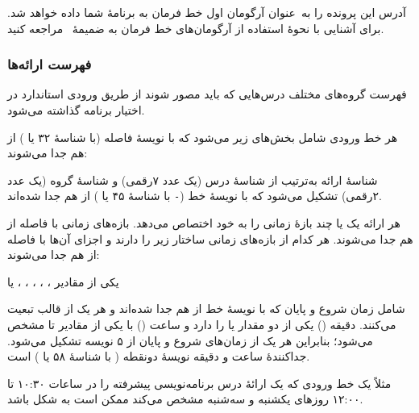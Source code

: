 \documentclass{utap}
\renewcommand{\labelitemi}{$\circ$}
\renewcommand{\labelitemii}{$\diamond$}
\begin{document}
    آدرس این پرونده را به~عنوان آرگومان اول خط فرمان به برنامهٔ شما داده خواهد شد. برای آشنایی با نحوهٔ استفاده از آرگومان‌های خط فرمان به ضمیمهٔ~ مراجعه کنید.

    \subsubsection{فهرست ارائه‌ها}

    فهرست گروه‌های مختلف درس‌هایی که باید مصور شوند از طریق ورودی استاندارد  در اختیار برنامه گذاشته می‌شود.

    هر خط ورودی شامل بخش‌های زیر می‌شود که با نویسهٔ فاصله (با شناسهٔ  ۳۲ یا ) از هم جدا می‌شوند:
    \begin{description}[leftmargin=9em,style=nextline,font=\labelitemi\quad\bfseries]
        \item[شناسهٔ ارائه] شناسهٔ ارائه به‌ترتیب از شناسهٔ درس (یک عدد ۷‌رقمی) و شناسهٔ گروه (یک عدد ۲‌رقمی) تشکیل می‌شود که با نویسهٔ خط (\verb|-| با شناسهٔ  ۴۵ یا ) از هم جدا شده‌اند.
        \item[بازه‌های زمانی ارائه] هر ارائه یک یا چند بازهٔ زمانی را به خود اختصاص می‌دهد. بازه‌های زمانی با فاصله از هم جدا می‌شوند. هر کدام از بازه‌های زمانی ساختار زیر را دارند و اجزای آن‌ها با فاصله از هم جدا می‌شوند:
        \begin{description}[leftmargin=4em,style=nextline,font=\labelitemii\quad\bfseries]
            \item[روز] یکی از مقادیر ، ، ، ، ،  یا 
            \item[زمان] شامل زمان شروع و پایان که با نویسهٔ خط از هم جدا شده‌اند و هر یک از قالب  تبعیت می‌کنند. دقیقه () یکی از دو مقدار  یا  را دارد و ساعت () با یکی از مقادیر  تا  مشخص می‌شود؛ بنابراین هر یک از زمان‌های شروع و پایان از ۵ نویسه تشکیل می‌شود. جداکنندهٔ ساعت و دقیقه نویسهٔ دونقطه (\lr{\texttt{:}} با شناسهٔ  ۵۸ یا ) است.
        \end{description}
    \end{description}

    مثلاً  یک خط ورودی که یک ارائهٔ درس برنامه‌نویسی پیشرفته را در ساعات ۱۰:۳۰ تا ۱۲:۰۰ روزهای یکشنبه و سه‌شنبه مشخص می‌کند ممکن است به شکل  باشد.
\end{document}
